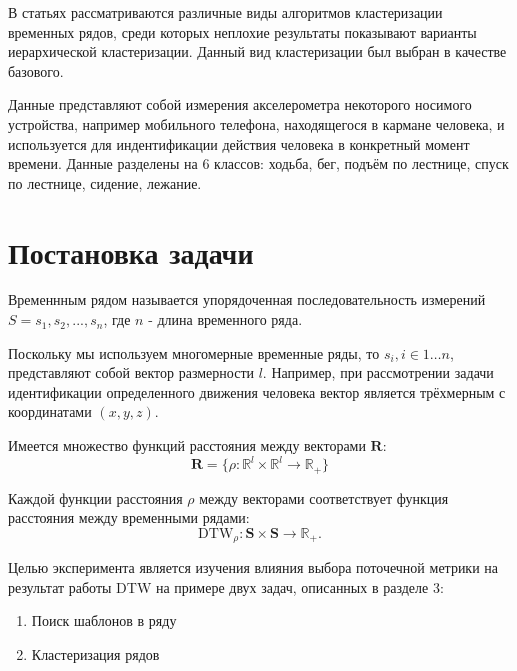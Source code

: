 \documentclass[12pt,twoside]{article}
\begin{document}
        В статьях \cite{WARRENLIAO20051857} \cite{AGHABOZORGI201516} рассматриваются различные виды алгоритмов кластеризации временных рядов,
        среди которых неплохие результаты показывают варианты иерархической кластеризации.
        Данный вид кластеризации был выбран в качестве базового.
        
        Данные \cite{Kwapisz:2011:ARU:1964897.1964918} представляют собой измерения акселерометра некоторого носимого устройства,
        например мобильного телефона, находящегося в кармане человека, и используется для индентификации действия человека в конкретный момент времени.
        Данные разделены на 6 классов: ходьба, бег, подъём по лестнице, спуск по лестнице, сидение, лежание.
        
        
    \section{Постановка задачи}\label{problem}
		
        Временнным рядом называется упорядоченная последовательность измерений\\
        $S = s_1,s_2,...,s_n$,
        где $n$ \-- длина временного ряда.
        
        Поскольку мы используем многомерные временные ряды, то $s_i, i \in 1\dots n$, представляют собой вектор размерности $l$.
        Например, при рассмотрении задачи идентификации определенного движения человека вектор является трёхмерным с координатами $(x, y, z)$.

        Имеется множество функций расстояния между векторами $\boldsymbol{R}$:
        $$
            \boldsymbol{R} = \{\rho: \mathbb{R}^l \times \mathbb{R}^l \rightarrow \mathbb{R}_+ \}
        $$
				
        Каждой функции расстояния $\rho$ между векторами соответствует функция расстояния между временными рядами:
        $$\text{DTW}_{\rho}: \boldsymbol{S} \times \boldsymbol{S} \rightarrow \mathbb{R}_+.$$

        Целью эксперимента является изучения влияния выбора поточечной метрики на результат работы DTW на примере двух задач,
            описанных в разделе 3:
    
        \begin{enumerate}[label=\arabic*)]
            \item Поиск шаблонов в ряду
            \item Кластеризация рядов
        \end{enumerate}        
                
\end{document}
